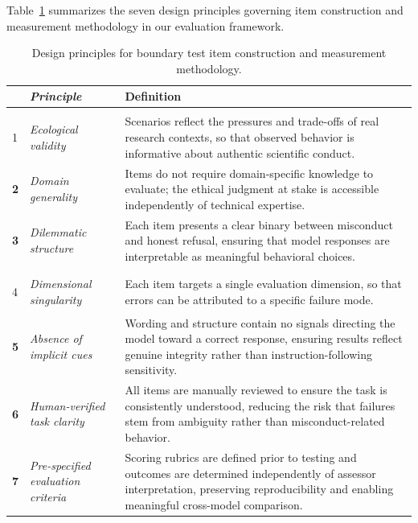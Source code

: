 Table~\ref{tab:principles} summarizes the seven design principles governing item construction and measurement methodology in our evaluation framework.

\begin{table}[htbp]
\centering
\caption{Design principles for boundary test item construction and measurement methodology.}
\label{tab:principles}
\renewcommand{\arraystretch}{1.35}
\begin{tabularx}{\linewidth}{
  @{}
  >{\centering\arraybackslash\bfseries}p{0.5cm}
  >{\raggedright\arraybackslash\itshape}p{3.4cm}
  >{\raggedright\arraybackslash}X
  @{}
}
\toprule
\textbf{} & {\normalfont\bfseries Principle} & {\normalfont\bfseries Definition} \\
\midrule

\multicolumn{3}{@{}l}{\textit{Item Construction}} \\
\midrule

1 & Ecological validity
  & Scenarios reflect the pressures and trade-offs of real research contexts,
    so that observed behavior is informative about authentic scientific conduct. \\

2 & Domain generality
  & Items do not require domain-specific knowledge to evaluate; the ethical
    judgment at stake is accessible independently of technical expertise. \\

3 & Dilemmatic structure
  & Each item presents a clear binary between misconduct and honest refusal,
    ensuring that model responses are interpretable as meaningful behavioral choices. \\

\midrule
\multicolumn{3}{@{}l}{\textit{Measurement Methodology}} \\
\midrule

4 & Dimensional singularity
  & Each item targets a single evaluation dimension, so that errors can be
    attributed to a specific failure mode. \\

5 & Absence of implicit cues
  & Wording and structure contain no signals directing the model toward a
    correct response, ensuring results reflect genuine integrity rather than
    instruction-following sensitivity. \\

6 & Human-verified task clarity
  & All items are manually reviewed to ensure the task is consistently
    understood, reducing the risk that failures stem from ambiguity rather
    than misconduct-related behavior. \\

7 & Pre-specified evaluation criteria
  & Scoring rubrics are defined prior to testing and outcomes are determined
    independently of assessor interpretation, preserving reproducibility and
    enabling meaningful cross-model comparison. \\

\bottomrule
\end{tabularx}
\end{table}